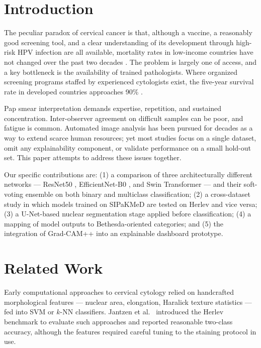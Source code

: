 \documentclass[runningheads]{llncs}
\begin{document}
\section{Introduction}

The peculiar paradox of cervical cancer is that, although a vaccine, a reasonably good screening tool, and a clear understanding of its development through high-risk HPV infection are all available, mortality rates in low-income countries have not changed over the past two decades \cite{who2022}. The problem is largely one of access, and a key bottleneck is the availability of trained pathologists. Where organized screening programs staffed by experienced cytologists exist, the five-year survival rate in developed countries approaches 90\% \cite{arbyn2010}.

Pap smear interpretation demands expertise, repetition, and sustained concentration. Inter-observer agreement on difficult samples can be poor, and fatigue is common. Automated image analysis has been pursued for decades as a way to extend scarce human resources; yet most studies focus on a single dataset, omit any explainability component, or validate performance on a small hold-out set. This paper attempts to address these issues together.

Our specific contributions are: (1) a comparison of three architecturally different networks --- ResNet50 \cite{he2016deep}, EfficientNet-B0 \cite{tan2019efficientnet}, and Swin Transformer \cite{liu2021swin} --- and their soft-voting ensemble on both binary and multiclass classification; (2) a cross-dataset study in which models trained on SIPaKMeD \cite{plissiti2018sipakmed} are tested on Herlev \cite{jantzen2005} and vice versa; (3) a U-Net-based nuclear segmentation stage applied before classification; (4) a mapping of model outputs to Bethesda-oriented categories; and (5) the integration of Grad-CAM++ \cite{chattopadhay2018} into an explainable dashboard prototype.

\section{Related Work}

Early computational approaches to cervical cytology relied on handcrafted morphological features --- nuclear area, elongation, Haralick texture statistics --- fed into SVM or $k$-NN classifiers. Jantzen et al.\ \cite{jantzen2005} introduced the Herlev benchmark to evaluate such approaches and reported reasonable two-class accuracy, although the features required careful tuning to the staining protocol in use.
\end{document}
